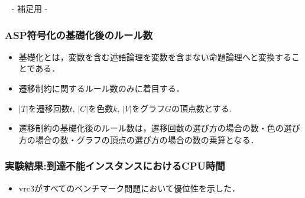 \appendix
\backupbegin

\begin{frame}{~}
 \centering
 - 補足用 -
\end{frame} 


\begin{frame}\frametitle{ASP符号化の基礎化後のルール数}
  \begin{itemize}
    \item 基礎化とは，変数を含む述語論理を変数を含まない命題論理へと変換することである．
    \item 遷移制約に関するルール数のみに着目する．
    \item $|T|$を遷移回数$t$, $|C|$を色数$k$, $|V|$をグラフ$G$の頂点数とする.
  \end{itemize}

  \begin{table}[t]
    \centering
    
  \end{table}

  \begin{itemize}
    \item 遷移制約の基礎化後のルール数は，遷移回数の選び方の場合の数・色の選び方の場合の数・グラフの頂点の選び方の場合の数の乗算となる．
  \end{itemize}
\end{frame}


\begin{frame}\frametitle{実験結果:到達不能インスタンスにおけるCPU時間}

  \begin{table}[t]
    \centering
      
  \end{table}

  \begin{itemize}
    \item vrc3がすべてのベンチマーク問題において優位性を示した．
  \end{itemize}
  
\end{frame}


